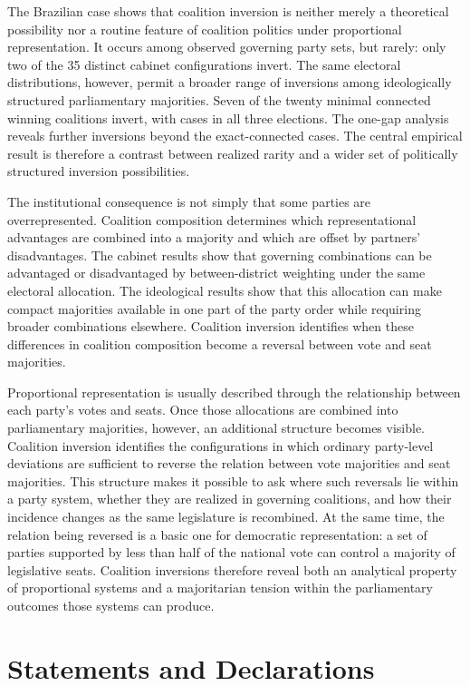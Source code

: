 \documentclass[11pt]{article}
\begin{document}
The Brazilian case shows that coalition inversion is neither merely a
theoretical possibility nor a routine feature of coalition politics under
proportional representation. It occurs among observed governing party sets, but
rarely: only two of the 35 distinct cabinet configurations invert. The same
electoral distributions, however, permit a broader range of inversions among
ideologically structured parliamentary majorities. Seven of the twenty minimal
connected winning coalitions invert, with cases in all three elections. The
one-gap analysis reveals further inversions beyond the exact-connected cases.
The central empirical result is therefore a contrast between realized rarity and
a wider set of politically structured inversion possibilities.

The institutional consequence is not simply that some parties are
overrepresented. Coalition composition determines which representational
advantages are combined into a majority and which are offset by partners'
disadvantages. The cabinet results show that governing combinations can
be advantaged or disadvantaged by between-district weighting
under the same electoral allocation.
The ideological results show that this allocation can make compact
majorities available in one part of the party order while requiring
broader combinations elsewhere. Coalition inversion identifies when these
differences in coalition composition become a reversal between vote and
seat majorities.

Proportional representation is usually described through the relationship
between each party's votes and seats. Once those allocations are combined
into parliamentary majorities, however, an additional structure becomes
visible. Coalition inversion identifies the configurations in which ordinary
party-level deviations are sufficient to reverse the relation between vote
majorities and seat majorities. This structure makes it possible to ask where
such reversals lie within a party system, whether they are realized in
governing coalitions, and how their incidence changes as the same legislature
is recombined. At the same time, the relation being reversed is a basic one
for democratic representation: a set of parties supported by less than half
of the national vote can control a majority of legislative seats. Coalition
inversions therefore reveal both an analytical property of proportional
systems and a majoritarian tension within the parliamentary outcomes those
systems can produce.



\section*{Statements and Declarations}  
\end{document}
